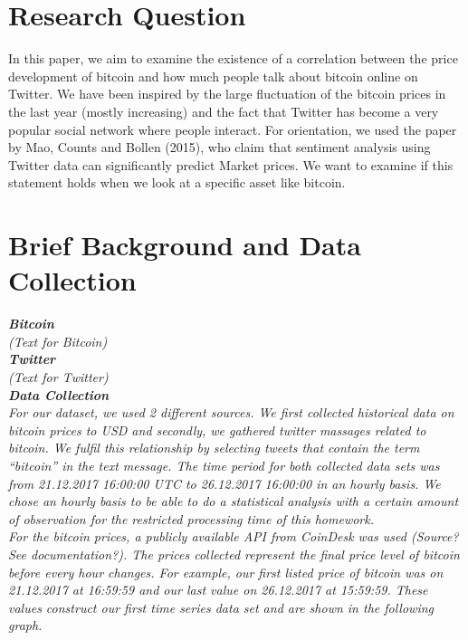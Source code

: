 \documentclass[a4paper,american,12pt]{article}
\begin{document}
	\begin{spacing}{1.2}
	\cleardoublepage{}
		
		\section{Research Question}
		\textnormal {In this paper, we aim to examine the existence of a correlation between the price development of bitcoin and how much people talk about bitcoin online on Twitter. We have been inspired by the large fluctuation of the bitcoin prices in the last year (mostly increasing) and the fact that Twitter has become a very popular social network where people interact. For orientation, we used the paper by Mao, Counts and Bollen (2015), who claim that sentiment analysis using Twitter data can significantly predict Market prices. We want to examine if this statement holds when we look at a specific asset like bitcoin.}\\
		
		\clearpage
		
		\section{Brief Background and Data Collection}
		\itshape\textbf {Bitcoin}\\
		\textnormal {(Text for Bitcoin)}\\
		
		\itshape\textbf {Twitter}\\
		\textnormal {(Text for Twitter)}\\
		
		\itshape\textbf {Data Collection}\\
		\textnormal {For our dataset, we used 2 different sources. We first collected historical data on bitcoin prices to USD and secondly, we gathered twitter massages related to bitcoin. We fulfil this relationship by selecting tweets that contain the term “bitcoin” in the text message. The time period for both collected data sets was from 21.12.2017 16:00:00 UTC to 26.12.2017 16:00:00 in an hourly basis. We chose an hourly basis to be able to do a statistical analysis with a certain amount of observation for the restricted processing time of this homework.\\
For the bitcoin prices, a publicly available API from CoinDesk was used (Source? See documentation?). The prices collected represent the final price level of bitcoin before every hour changes. For example, our first listed price of bitcoin was on 21.12.2017 at 16:59:59 and our last value on 26.12.2017 at 15:59:59. These values construct our first time series data set and are shown in the following graph.\\}
				

\end{spacing}
\end{document}
